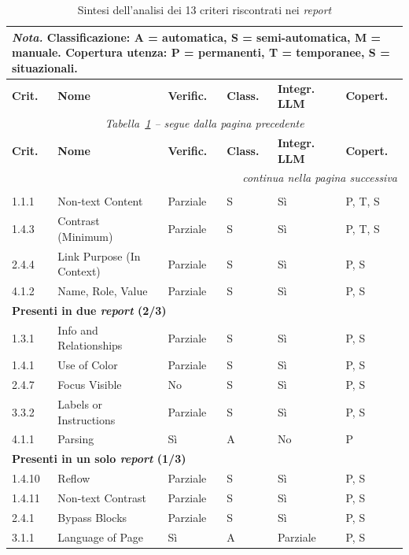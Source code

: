 {\small
\begin{longtable}{|p{1.2cm}|p{4.3cm}|p{1.6cm}|p{1.1cm}|p{1.6cm}|p{1.2cm}|}
\caption{Sintesi dell'analisi dei 13 criteri riscontrati nei \emph{report}} 
\label{tab:sintesi-analisi} \\ 
[-0.3em] 
\multicolumn{6}{p{\dimexpr\linewidth-6\tabcolsep}}{\footnotesize \textit{Nota.} Classificazione: A = automatica, S = semi-automatica, M = manuale. Copertura utenza: P = permanenti, T = temporanee, S = situazionali. } \\
[0.6em] 
\hline
\textbf{Crit.} & \textbf{Nome} & \textbf{Verific.} & \textbf{Class.} & \textbf{Integr. LLM} & \textbf{Copert.} \\
\hline
\endfirsthead
\multicolumn{6}{c}{\textit{Tabella~\ref{tab:sintesi-analisi} -- segue dalla pagina precedente}} \\
\hline
\textbf{Crit.} & \textbf{Nome} & \textbf{Verific.} & \textbf{Class.} & \textbf{Integr. LLM} & \textbf{Copert.} \\
\hline
\endhead
\hline
\multicolumn{6}{r}{\textit{continua nella pagina successiva}} \\
\endfoot
\hline
\endlastfoot
\multicolumn{6}{|c|}{\textbf{Presenti in tutti e tre i \emph{report} (3/3)}} \\
\hline
1.1.1 & Non-text Content & Parziale & S & Sì & P, T, S \\
\hline
1.4.3 & Contrast (Minimum) & Parziale & S & Sì & P, T, S \\
\hline
2.4.4 & Link Purpose (In Context) & Parziale & S & Sì & P, S \\
\hline
4.1.2 & Name, Role, Value & Parziale & S & Sì & P, S \\
\hline
\multicolumn{6}{|l|}{\textbf{Presenti in due \emph{report} (2/3)}} \\
\hline
1.3.1 & Info and Relationships & Parziale & S & Sì & P, S \\
\hline
1.4.1 & Use of Color & Parziale & S & Sì & P, S \\
\hline
2.4.7 & Focus Visible & No & S & Sì & P, S \\
\hline
3.3.2 & Labels or Instructions & Parziale & S & Sì & P, S \\
\hline
4.1.1 & Parsing & Sì & A & No & P \\
\hline
\multicolumn{6}{|l|}{\textbf{Presenti in un solo \emph{report} (1/3)}} \\
\hline
1.4.10 & Reflow & Parziale & S & Sì & P, S \\
\hline
1.4.11 & Non-text Contrast & Parziale & S & Sì & P, S \\
\hline
2.4.1 & Bypass Blocks & Parziale & S & Sì & P, S \\
\hline
3.1.1 & Language of Page & Sì & A & Parziale & P, S \\
\hline
\end{longtable}
}

